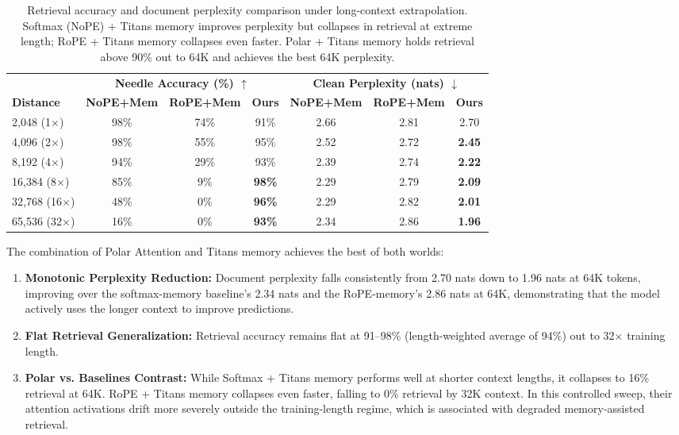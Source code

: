 \documentclass{article} %
\begin{document}
\begin{table}[h]
\centering
\small
\setlength{\tabcolsep}{5pt}
\begin{tabular}{lcccccc}
\toprule
 & \multicolumn{3}{c}{\textbf{Needle Accuracy (\%) $\uparrow$}} & \multicolumn{3}{c}{\textbf{Clean Perplexity (nats) $\downarrow$}} \\
\cmidrule(lr){2-4} \cmidrule(lr){5-7}
\textbf{Distance} & \textbf{NoPE+Mem} & \textbf{RoPE+Mem} & \textbf{Ours} & \textbf{NoPE+Mem} & \textbf{RoPE+Mem} & \textbf{Ours} \\
\midrule
2,048 (1$\times$)  & 98\% & 74\% & 91\% & 2.66 & 2.81 & 2.70 \\
4,096 (2$\times$)  & 98\% & 55\% & 95\% & 2.52 & 2.72 & \textbf{2.45} \\
8,192 (4$\times$)  & 94\% & 29\% & 93\% & 2.39 & 2.74 & \textbf{2.22} \\
16,384 (8$\times$) & 85\% & 9\%  & \textbf{98\%} & 2.29 & 2.79 & \textbf{2.09} \\
32,768 (16$\times$)& 48\% & 0\%  & \textbf{96\%} & 2.29 & 2.82 & \textbf{2.01} \\
65,536 (32$\times$)& 16\% & 0\%  & \textbf{93\%} & 2.34 & 2.86 & \textbf{1.96} \\
\bottomrule
\end{tabular}
\caption{Retrieval accuracy and document perplexity comparison under long-context extrapolation. Softmax (NoPE) + Titans memory improves perplexity but collapses in retrieval at extreme length; RoPE + Titans memory collapses even faster. Polar + Titans memory holds retrieval above 90\% out to 64K and achieves the best 64K perplexity.}
\label{table:memory_unlock}
\end{table}

The combination of Polar Attention and Titans memory achieves the best of both worlds:
\begin{enumerate}
    \item \textbf{Monotonic Perplexity Reduction:} Document perplexity falls consistently from 2.70 nats down to 1.96 nats at 64K tokens, improving over the softmax-memory baseline's 2.34 nats and the RoPE-memory's 2.86 nats at 64K, demonstrating that the model actively uses the longer context to improve predictions.
    \item \textbf{Flat Retrieval Generalization:} Retrieval accuracy remains flat at 91--98\% (length-weighted average of 94\%) out to 32$\times$ training length.
    \item \textbf{Polar vs. Baselines Contrast:} While Softmax + Titans memory performs well at shorter context lengths, it collapses to 16\% retrieval at 64K. RoPE + Titans memory collapses even faster, falling to 0\% retrieval by 32K context. In this controlled sweep, their attention activations drift more severely outside the training-length regime, which is associated with degraded memory-assisted retrieval.
\end{enumerate}
\end{document}
